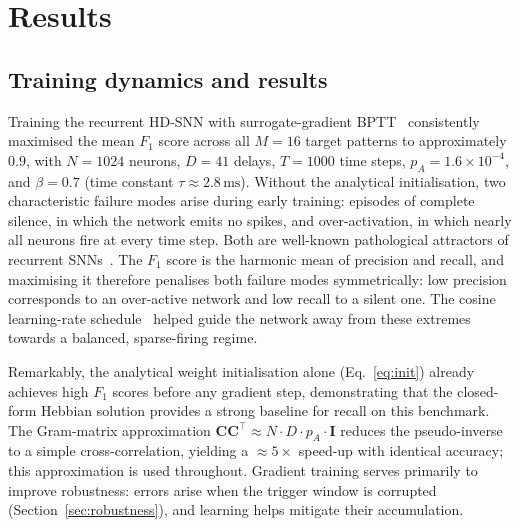 \documentclass{scrartcl}
\newcommand{\citep}[1]{\parencite{#1}}
\begin{document}
\section{Results}
\label{sec:results}
\subsection{Training dynamics and results}
%
Training the recurrent HD-SNN with surrogate-gradient BPTT~\citep{Neftci2019a} consistently maximised the mean $F_1$ score across all $M=16$ target patterns to approximately $0.9$, with $N=1024$ neurons, $D=41$ delays, $T=1000$ time steps, $p_A=1.6\times10^{-4}$, and $\beta=0.7$ (time constant $\tau \approx 2.8\,\mathrm{ms}$). Without the analytical initialisation, two characteristic failure modes arise during early training: episodes of complete silence, in which the network emits no spikes, and over-activation, in which nearly all neurons fire at every time step. Both are well-known pathological attractors of recurrent SNNs~\citep{Izhikevich2006}. The $F_1$ score is the harmonic mean of precision and recall, and maximising it therefore penalises both failure modes symmetrically: low precision corresponds to an over-active network and low recall to a silent one. The cosine learning-rate schedule~\citep{Hammouamri2023} helped guide the network away from these extremes towards a balanced, sparse-firing regime. 

Remarkably, the analytical weight initialisation alone (Eq.~\ref{eq:init}) already achieves high $F_1$ scores before any gradient step, demonstrating that the closed-form Hebbian solution provides a strong baseline for recall on this benchmark. The Gram-matrix approximation $\mathbf{C}\mathbf{C}^\top \approx N \cdot D \cdot p_A \cdot \mathbf{I}$ reduces the pseudo-inverse to a simple cross-correlation, yielding a ${\approx}5\times$ speed-up with identical accuracy; this approximation is used throughout. Gradient training serves primarily to improve robustness: errors arise when the trigger window is corrupted (Section~\ref{sec:robustness}), and learning helps mitigate their accumulation.


\end{document}
